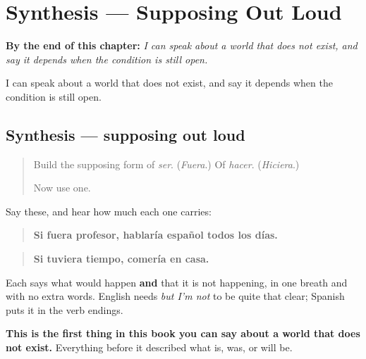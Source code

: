 
\chapter{Synthesis --- Supposing Out Loud}
\label{ch:sintesis-condiciones}

\begin{chapteropening}
\textbf{By the end of this chapter:} \emph{I can speak about a world that does not exist, and say it depends when the condition is still open.}

I can speak about a world that does not exist, and say it depends when the condition is still open.
\end{chapteropening}

\section[Practice]{Synthesis — supposing out loud}

\label{lesson:ES-C56-sintesis-condiciones}



\begin{quote}
Build the supposing form of \emph{ser}. (\emph{Fuera}.) Of \emph{hacer}. (\emph{Hiciera}.)

Now use one.
\end{quote}

\begin{grammarlens}[title={What you've built}]
Say these, and hear how much each one carries:

\begin{quote}
\textbf{Si fuera profesor, hablaría español todos los días.}
\end{quote}

\begin{quote}
\textbf{Si tuviera tiempo, comería en casa.}
\end{quote}

Each says what would happen \textbf{and} that it is not happening, in one breath and with no extra words. English needs \emph{but I'm not} to be quite that clear; Spanish puts it in the verb endings.

\textbf{This is the first thing in this book you can say about a world that does not exist.} Everything before it described what is, was, or will be.
\end{grammarlens}

